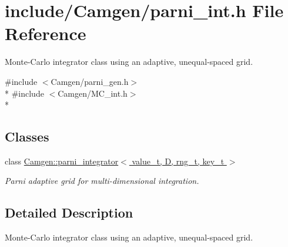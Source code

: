 \hypertarget{a00708}{}\section{include/\+Camgen/parni\+\_\+int.h File Reference}
\label{a00708}


Monte-\/\+Carlo integrator class using an adaptive, unequal-\/spaced grid.  


{\ttfamily \#include $<$Camgen/parni\+\_\+gen.\+h$>$}\\*
{\ttfamily \#include $<$Camgen/\+M\+C\+\_\+int.\+h$>$}\\*
\subsection*{Classes}
\begin{DoxyCompactItemize}
\item 
class \hyperlink{a00395}{Camgen\+::parni\+\_\+integrator$<$ value\+\_\+t, D, rng\+\_\+t, key\+\_\+t $>$}
\begin{DoxyCompactList}\small\item\em Parni adaptive grid for multi-\/dimensional integration. \end{DoxyCompactList}\end{DoxyCompactItemize}


\subsection{Detailed Description}
Monte-\/\+Carlo integrator class using an adaptive, unequal-\/spaced grid. 

